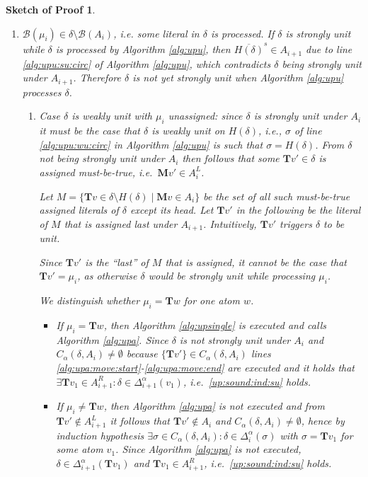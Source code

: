 \documentclass{vutinfth} %
\newtheorem{proof-sketch}{Sketch of Proof}[chapter]
\newcommand{\mbt}{must-be-true\xspace}
\newcommand{\negstrong}[1]{\overline{#1}^s}
\newcommand{\bass}{\mathcal{B}}
\newcommand{\bpro}{\mathcal{B}}
\newcommand{\ass}{A}
\newcommand{\bT}{\mathbf{T}}
\newcommand{\bM}{\mathbf{M}}
\newcommand{\cdal}{C_\alpha}
\newcommand{\dal}{\Delta^\alpha}
\newcommand{\headf}{H}
\newcommand{\sgl}{\mu}
\newcommand{\bsgl}{\sigma}
\begin{document}
\begin{proof-sketch}
\begin{enumerate}
\begin{enumerate}
\begin{enumerate}
	\item 	$\bpro(\sgl_i) \in \delta \setminus \bass(\ass_i)$, i.e. some literal in $\delta$ is processed. If $\delta$ is strongly unit while $\delta$ is processed by Algorithm \ref{alg:upu}, then $\negstrong{\headf(\delta)} \in \ass_{i+1}$ due to line \ref{alg:upu:su:circ} of Algorithm \ref{alg:upu}, which contradicts $\delta$ being strongly unit under $\ass_{i+1}$. Therefore $\delta$ is not yet strongly unit when Algorithm \ref{alg:upu} processes $\delta$.
	

	\begin{enumerate}
		\item Case $\delta$ is weakly unit with $\sgl_i$ unassigned: since $\delta$ is strongly unit under $\ass_i$ it must be the case that $\delta$ is weakly unit on $\headf(\delta)$, i.e., $\bsgl$ of line \ref{alg:upu:wu:circ} in Algorithm \ref{alg:upu} is such that $\bsgl = \headf(\delta)$. From $\delta$ not being strongly unit under $\ass_i$  then follows that some $\bT v' \in \delta$ is assigned \emph{\mbt}, i.e.~$\bM v' \in \ass_i^L$.
	
	Let $M = \{ \bT v \in \delta \setminus \headf(\delta) \mid \bM v \in \ass_i \}$ be the set of all such \emph{\mbt} assigned literals of $\delta$ except its head. Let $\bT v'$ in the following be the literal of $M$ that is assigned last under $\ass_{i+1}$. Intuitively, $\bT v'$ triggers $\delta$ to be unit.
	
	Since $\bT v'$ is the \enquote{last} of $M$ that is assigned, it cannot be the case that $\bT v' = \sgl_i$, as otherwise $\delta$ would be strongly unit while processing $\sgl_i$.
	
	We distinguish whether $\sgl_i = \bT w$ for one atom $w$.
	
	\begin{itemize}
		\item If $\sgl_i = \bT w$, then Algorithm \ref{alg:upsingle} is executed and calls Algorithm \ref{alg:upa}. Since $\delta$ is not strongly unit under $\ass_i$ and $\cdal(\delta, \ass_i) \not = \emptyset$ because $\{ \bT v' \} \in \cdal(\delta, \ass_i)$ lines \ref{alg:upa:move:start}-\ref{alg:upa:move:end} are executed and it holds that $\exists \bT v_1 \in \ass_{i+1}^R : \delta \in \dal_{i+1}(v_1)$, i.e.~\ref{up:sound:ind:su} holds.
	
		\item If $\sgl_i \not = \bT w$, then Algorithm \ref{alg:upa} is not executed and from $\bT v' \not \in \ass_{i+1}^L$ it follows that $\bT v' \not \in \ass_i$ and $\cdal(\delta, \ass_i) \not = \emptyset$, hence by induction hypothesis $\exists \bsgl \in \cdal(\delta, \ass_i) : \delta \in \dal_i(\bsgl)$ with $\bsgl = \bT v_1$ for some atom $v_1$. Since Algorithm \ref{alg:upa} is not executed, $\delta \in \dal_{i+1}(\bT v_1)$ and $\bT v_1 \in \ass_{i+1}^R$, i.e.~\ref{up:sound:ind:su} holds.
	

\end{itemize}
\end{enumerate}
\end{enumerate}
\end{enumerate}
\end{enumerate}
\end{proof-sketch}
\end{document}

